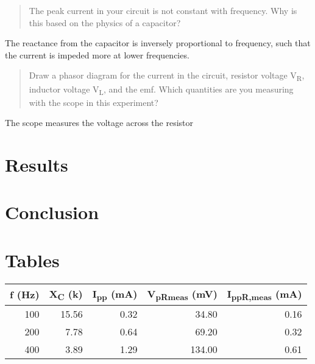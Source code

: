 \documentclass{article}
\begin{document}
		\begin{quotation}
			The peak current in your circuit is not constant with frequency. Why is this based on the physics of a capacitor?
		\end{quotation}
		The reactance from the capacitor is inversely proportional to frequency, such that the current is impeded more at lower frequencies.

		\begin{quotation}
			Draw a phasor diagram for the current in the circuit, resistor voltage V\textsubscript{R}, inductor voltage V\textsubscript{L}, and the emf. Which quantities are you measuring with the scope in this experiment?
		\end{quotation}
		The scope measures the voltage across the resistor

	\section{Results}
	\section{Conclusion}
	\section*{Tables}

		\begin{table}[]
			\begin{tabular}{@{}rrrrr@{}}
			\toprule
			\multicolumn{1}{l}{f (Hz)} & \multicolumn{1}{l}{X\textsubscript{C} (k\textOmega)} & \multicolumn{1}{l}{I\textsubscript{pp} (mA)} & \multicolumn{1}{l}{V\textsubscript{pRmeas} (mV)} & \multicolumn{1}{l}{I\textsubscript{ppR,meas} (mA)} \\ \midrule
			100 & 15.56 & 0.32 & 34.80  & 0.16 \\
			200 & 7.78  & 0.64 & 69.20  & 0.32 \\
			400 & 3.89  & 1.29 & 134.00 & 0.61 \\ \bottomrule
		\end{tabular}
	\end{table}
\end{document}
